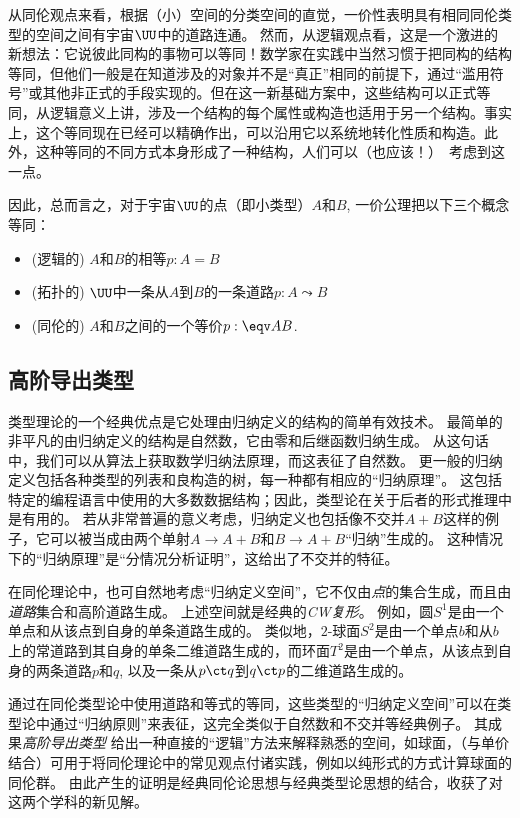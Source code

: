 从同伦观点来看，根据（小）空间的分类空间的直觉，一价性表明具有相同同伦类型的空间之间有宇宙$\UU$中的道路连通。
然而，从逻辑观点看，这是一个激进的新想法：它说彼此同构的事物可以等同！数学家在实践中当然习惯于把同构的结构等同，但他们一般是在知道涉及的对象并不是“真正”相同的前提下，通过“滥用符号”或其他非正式的手段实现的。但在这一新基础方案中，这些结构可以正式等同，从逻辑意义上讲，涉及一个结构的每个属性或构造也适用于另一个结构。事实上，这个等同现在已经可以精确作出，可以沿用它以系统地转化性质和构造。此外，这种等同的不同方式本身形成了一种结构，人们可以（也应该！）\ 考虑到这一点。

因此，总而言之，对于宇宙$\UU$的点（即小类型）$A$和$B$, 一价公理把以下三个概念等同：
\begin{itemize}
\item (逻辑的) $A$和$B$的相等$p:A=B$
\item (拓扑的) $\UU$中一条从$A$到$B$的一条道路$p:A \leadsto B$
\item (同伦的) $A$和$B$之间的一个等价$p:\eqv A B$.
\end{itemize}

\subsection*{高阶导出类型}%

类型理论的一个经典优点是它处理由归纳定义的结构的简单有效技术。
最简单的非平凡的由归纳定义的结构是自然数，它由零和后继函数归纳生成。
从这句话中，我们可以从算法上获取数学归纳法原理，而这表征了自然数。
更一般的归纳定义包括各种类型的列表和良构造的树，每一种都有相应的“归纳原理”。
这包括特定的编程语言中使用的大多数数据结构；因此，类型论在关于后者的形式推理中是有用的。
若从非常普遍的意义考虑，归纳定义也包括像不交并$A+B$这样的例子，它可以被当成由两个单射$A\to A+B$和$B\to A+B$“归纳”生成的。
这种情况下的“归纳原理”是“分情况分析证明”，这给出了不交并的特征。

在同伦理论中，也可自然地考虑“归纳定义空间”，它不仅由\emph{点}的集合生成，而且由\emph{道路}集合和高阶道路生成。
上述空间就是经典的\emph{CW复形}。
%
例如，圆$S^1$是由一个单点和从该点到自身的单条道路生成的。
类似地，$2$-球面$S^2$是由一个单点$b$和从$b$上的常道路到其自身的单条二维道路生成的，而环面$T^2$是由一个单点，从该点到自身的两条道路$p$和$q$, 以及一条从$p\ct q$到$q\ct p$的二维道路生成的。

通过在同伦类型论中使用道路和等式的等同，这些类型的“归纳定义空间”可以在类型论中通过“归纳原则”来表征，这完全类似于自然数和不交并等经典例子。
其成果\emph{高阶导出类型}
%
给出一种直接的“逻辑”方法来解释熟悉的空间，如球面，（与单价结合）可用于将同伦理论中的常见观点付诸实践，例如以纯形式的方式计算球面的同伦群。
由此产生的证明是经典同伦论思想与经典类型论思想的结合，收获了对这两个学科的新见解。

